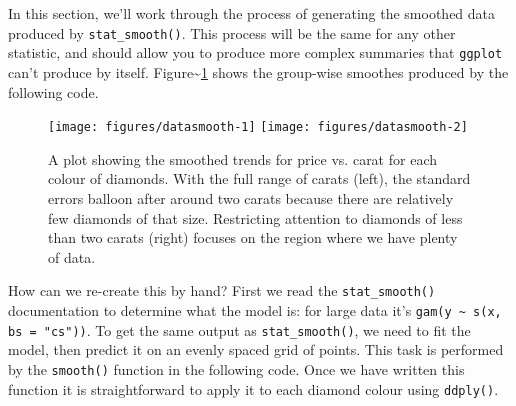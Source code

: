 In this section, we'll work through the process of generating the
smoothed data produced by \texttt{stat\_smooth()}. This process will be
the same for any other statistic, and should allow you to produce more
complex summaries that \texttt{ggplot} can't produce by itself.
Figure\textasciitilde{}\ref{fig:smooth} shows the group-wise smoothes
produced by the following code. 

\begin{Shaded}
\begin{Highlighting}[]
  \NormalTok{, }
   
\StringTok{ }\StringTok{ }\NormalTok{)}
  \NormalTok{, }
    \NormalTok{)}
\end{Highlighting}
\end{Shaded}

\begin{figure}

{\centering \texttt{[image: figures/datasmooth-1]} \texttt{[image: figures/datasmooth-2]} 

}

\caption{A plot showing the smoothed trends for price vs. carat for each colour of diamonds. With the full range of carats (left), the standard errors balloon after around two carats because there are relatively few diamonds of that size. Restricting attention to diamonds of less than two carats (right) focuses on the region where we have plenty of data.\label{fig:smooth}}
\end{figure}

How can we re-create this by hand? First we read the
\texttt{stat\_smooth()} documentation to determine what the model is:
for large data it's \texttt{gam(y \textasciitilde{} s(x, bs = "cs"))}.
To get the same output as \texttt{stat\_smooth()}, we need to fit the
model, then predict it on an evenly spaced grid of points. This task is
performed by the \texttt{smooth()} function in the following code. Once
we have written this function it is straightforward to apply it to each
diamond colour using \texttt{ddply()}. 

